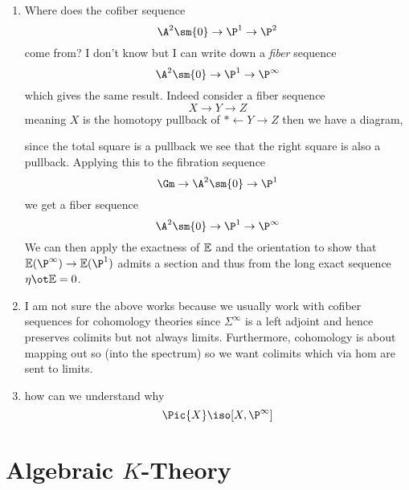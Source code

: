 \documentclass{article}
\begin{document}
\begin{enumerate}
\item Where does the cofiber sequence
\[ \A^2 \sm \{ 0 \} \to \P^1 \to \P^2 \]
come from? I don't know but I can write down a \textit{fiber} sequence
\[ \A^2 \sm \{ 0 \} \to \P^1 \to \P^\infty \]
which gives the same result. Indeed consider a fiber sequence
\[ X \to Y \to Z \]
meaning $X$ is the homotopy pullback of $* \leftarrow Y \to Z$ then we have a diagram,
\begin{center}
\end{center}
since the total square is a pullback we see that the right square is also a pullback. 
Applying this to the fibration sequence
\[ \Gm \to \A^2 \sm \{ 0 \} \to \P^1 \]
we get a fiber sequence
\[ \A^2 \sm \{ 0 \} \to \P^1 \to \P^\infty \]
We can then apply the exactness of $\mathbb{E}$ and the orientation to show that $\EE(\P^\infty) \to \EE(\P^1)$ admits a section and thus from the long exact sequence $\eta \ot \EE = 0$.

\item I am not sure the above works because we usually work with cofiber sequences for cohomology theories since $\Sigma^\infty$ is a left adjoint and hence preserves colimits but not always limits. Furthermore, cohomology is about mapping out so (into the spectrum) so we want colimits which via hom are sent to limits.

\item how can we understand why
\[ \Pic{X} \iso [X, \P^\infty] \]
\end{enumerate}

\section{Algebraic $K$-Theory}

\newcommand{\perf}{\mathrm{perf}}
\end{document}
